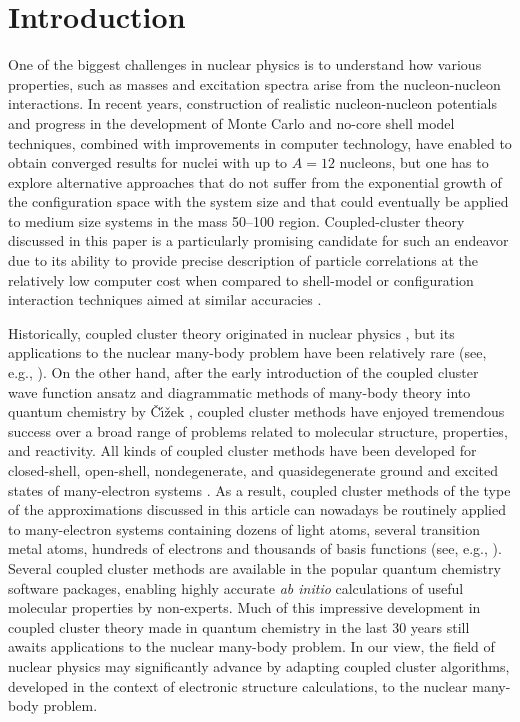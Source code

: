 \documentclass[epj]{svjour}
\begin{document}
\section{Introduction}
\label{section:1}
One of the biggest challenges in nuclear physics
is to understand how various properties, such as
masses and excitation spectra
arise from the nucleon-nucleon interactions.
In recent years, construction of realistic nucleon-nucleon
potentials and progress in the development of
Monte Carlo \cite{pieper02} and no-core shell model
\cite{navratil02} techniques, combined with improvements in computer
technology, have enabled to obtain converged results for nuclei with up
to $A=12$ nucleons, but one has to explore alternative approaches
that do not suffer from the exponential growth
of the configuration space with the system size and
that could eventually be applied to medium size systems in the
mass 50--100 region. Coupled-cluster theory \cite{coester,cizek} discussed in this paper
is a particularly promising candidate for such an endeavor
due to its ability to provide precise description
of particle correlations at the relatively low computer cost
when compared to shell-model or configuration interaction techniques aimed at
similar accuracies \cite{chem_rev,piecuch02}.

Historically, coupled cluster theory originated in nuclear physics
\cite{coester}, but its applications to the
nuclear many-body problem have been relatively rare
(see, e.g., \cite{kum78}). On the other hand,
after the early introduction of the coupled cluster wave function ansatz
and diagrammatic methods of many-body theory
into quantum chemistry by \v{C}\'{\i}\v{z}ek \cite{cizek},
coupled cluster methods have enjoyed tremendous success over a broad range of
problems related to molecular structure, properties, and reactivity.
All kinds of
coupled cluster methods have been developed for closed-shell, open-shell,
nondegenerate, and quasidegenerate ground and excited states
of many-electron systems \cite{chem_rev,piecuch02}. As a result,
coupled cluster methods of the type of
the approximations discussed in this
article can nowadays be routinely
applied to many-electron systems containing dozens of light atoms,
several transition metal atoms,
hundreds of electrons and thousands of basis functions
(see, e.g., \cite{PPschutz2002}).
Several coupled cluster methods are available in the
popular quantum chemistry software packages, enabling highly accurate
{\it ab initio} calculations of useful molecular properties by non-experts.
Much of this impressive development in coupled cluster
theory made in quantum chemistry in
the last 30 years still awaits applications to the nuclear many-body problem.
In our view, the field of nuclear physics may significantly advance
by adapting coupled cluster algorithms, developed in the context of
electronic structure calculations, to the nuclear many-body problem.
\end{document}
